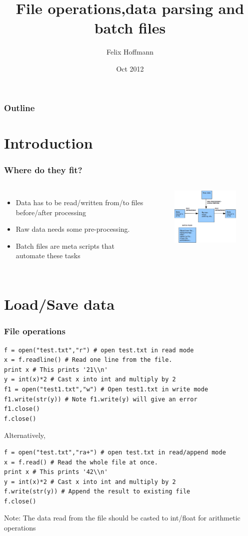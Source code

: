 \documentclass[xcolor=table]{beamer}
\title {File operations,data parsing and batch files}
\author[Felix Hoffmann]{Felix Hoffmann}
\institute[BCF]{Bernstein Center Freiburg}
\date[]{Oct 2012}
\begin{document}
\begin{frame} 
\titlepage
\end{frame}


\begin{frame} 
\frametitle{Outline}
\tableofcontents[pausesections]
\end{frame}


\section{Introduction}
\begin{frame}
\frametitle{Where do they fit?}
\begin{columns}
\column{2.0in}
\begin{itemize}
\item Data has to be read/written from/to files before/after processing    
\item Raw data needs some pre-processing.  
\item Batch files are meta scripts that automate these tasks  
\end{itemize}
\column{2.0in}
\begin{figure}
    \centering
    \includegraphics[width=2.0in]{Fits.eps}
\end{figure}
\end{columns}
\end{frame}

\section{Load/Save data}
\begin{frame}[fragile]
\frametitle{File operations}
\tiny
\begin{verbatim}
f = open("test.txt","r") # open test.txt in read mode
x = f.readline() # Read one line from the file. 
print x # This prints '21\\n'
y = int(x)*2 # Cast x into int and multiply by 2
f1 = open("test1.txt","w") # Open test1.txt in write mode
f1.write(str(y)) # Note f1.write(y) will give an error
f1.close()
f.close()
\end{verbatim}
\small
Alternatively,
\tiny
\begin{verbatim}
f = open("test.txt","ra+") # open test.txt in read/append mode
x = f.read() # Read the whole file at once.
print x # This prints '42\\n'
y = int(x)*2 # Cast x into int and multiply by 2
f.write(str(y)) # Append the result to existing file 
f.close()
\end{verbatim}
\small
Note: The data read from the file should be casted to int/float for arithmetic operations
\end{frame}
\end{document}
